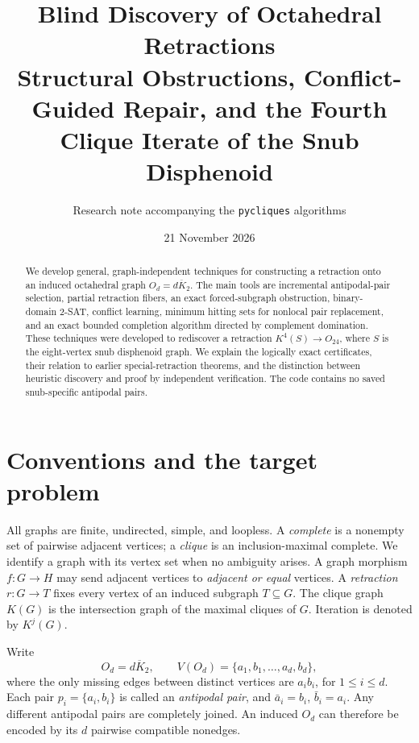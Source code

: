 \documentclass[11pt]{article}
\title{Blind Discovery of Octahedral Retractions\\
\large Structural Obstructions, Conflict-Guided Repair, and the Fourth Clique Iterate of the Snub Disphenoid}
\author{Research note accompanying the \texttt{pycliques} algorithms}
\date{21 November 2026}
\begin{document}
\maketitle
\begin{abstract}
We develop general, graph-independent techniques for constructing a retraction
onto an induced octahedral graph \(O_d=\overline{dK_2}\). The main tools are
incremental antipodal-pair selection, partial retraction fibers,
an exact forced-subgraph obstruction, binary-domain 2-SAT, conflict learning,
minimum hitting sets for nonlocal pair replacement, and an exact bounded
completion algorithm directed by complement domination. These techniques
were developed to rediscover a retraction \(K^4(S)\to O_{24}\), where \(S\)
is the eight-vertex snub disphenoid graph. We explain the logically exact
certificates, their relation to earlier special-retraction theorems,
and the distinction between heuristic discovery and proof by independent
verification. The code contains no saved snub-specific antipodal pairs.
\end{abstract}
\tableofcontents

\section{Conventions and the target problem}
All graphs are finite, undirected, simple, and loopless. A \emph{complete}
is a nonempty set of pairwise adjacent vertices; a \emph{clique} is an
inclusion-maximal complete. We identify a graph with its vertex set when
no ambiguity arises. A graph morphism \(f:G\to H\) may send adjacent
vertices to \emph{adjacent or equal} vertices. A \emph{retraction}
\(r:G\to T\) fixes every vertex of an induced subgraph \(T\subseteq G\).
The clique graph \(K(G)\) is the intersection graph of the maximal cliques
of \(G\). Iteration is denoted by \(K^j(G)\).

Write
\[
   O_d=\overline{dK_2},\qquad
   V(O_d)=\{a_1,b_1,\ldots,a_d,b_d\},
\]
where the only missing edges between distinct vertices are
\(a_ib_i\), for \(1\le i\le d\). Each pair \(p_i=\{a_i,b_i\}\)
is called an \emph{antipodal pair}, and \(\bar a_i=b_i\),
\(\bar b_i=a_i\). Any different antipodal pairs are completely joined.
An induced \(O_d\) can therefore be encoded by its \(d\) pairwise compatible
nonedges.
\end{document}
